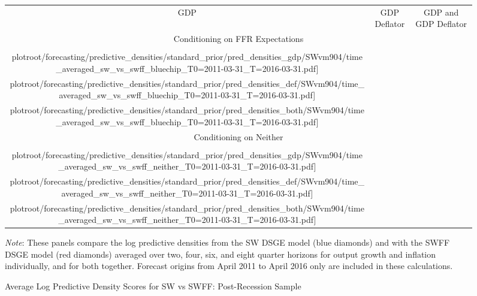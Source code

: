 \documentclass[12pt]{article}
\theoremstyle{definition}
\newcommand\plotroot{../figures_for_paper}
\begin{document}
 \begin{figure}[H]
    \caption{Average Log Predictive Density Scores for SW vs SWFF: Post-Recession Sample}
    \label{fig:avgpreddens_sw_vs_swff_post_recession}
      \vspace*{-0.75cm}
  \begin{center}
        \begin{tabular}{@{\hspace*{-.4cm}}ccc}
            GDP & GDP Deflator & GDP and GDP Deflator \\[-.5ex]
            \multicolumn{3}{c}{Conditioning on FFR Expectations} \\[-.5ex]
            \texttt{[image: \\plotroot/forecasting/predictive\_densities/standard\_prior/pred\_densities\_gdp/SWvm904/time\_averaged\_sw\_vs\_swff\_bluechip\_T0=2011-03-31\_T=2016-03-31.pdf]} &
            \texttt{[image: \\plotroot/forecasting/predictive\_densities/standard\_prior/pred\_densities\_def/SWvm904/time\_averaged\_sw\_vs\_swff\_bluechip\_T0=2011-03-31\_T=2016-03-31.pdf]} &
            \texttt{[image: \\plotroot/forecasting/predictive\_densities/standard\_prior/pred\_densities\_both/SWvm904/time\_averaged\_sw\_vs\_swff\_bluechip\_T0=2011-03-31\_T=2016-03-31.pdf]} \\[-.5ex]
            \multicolumn{3}{c}{Conditioning on Neither} \\[-.5ex]
            \texttt{[image: \\plotroot/forecasting/predictive\_densities/standard\_prior/pred\_densities\_gdp/SWvm904/time\_averaged\_sw\_vs\_swff\_neither\_T0=2011-03-31\_T=2016-03-31.pdf]} &
            \texttt{[image: \\plotroot/forecasting/predictive\_densities/standard\_prior/pred\_densities\_def/SWvm904/time\_averaged\_sw\_vs\_swff\_neither\_T0=2011-03-31\_T=2016-03-31.pdf]} &
            \texttt{[image: \\plotroot/forecasting/predictive\_densities/standard\_prior/pred\_densities\_both/SWvm904/time\_averaged\_sw\_vs\_swff\_neither\_T0=2011-03-31\_T=2016-03-31.pdf]} \\[-.5ex]
        \end{tabular}
    \end{center}
    \begin{minipage}{\textwidth}
        \vspace{-.5cm}
        \scriptsize
        \setlength{\baselineskip}{2mm}
        \emph{Note}: These panels compare the log predictive densities from the SW DSGE model (blue diamonds) and with the SWFF DSGE model (red diamonds) averaged over two, four, six, and eight quarter horizons for output growth and inflation individually, and for both together. Forecast origins from April 2011 to April 2016 only are included in these calculations.
    \end{minipage}
 \end{figure}
\clearpage
\end{document}
